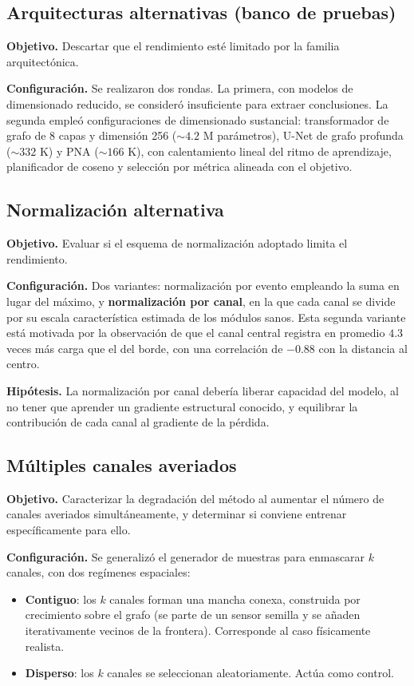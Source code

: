 \subsection{Arquitecturas alternativas (banco de pruebas)}
\label{subsec:exp-sandbox}

\textbf{Objetivo.} Descartar que el rendimiento esté limitado por la familia arquitectónica.

\textbf{Configuración.} Se realizaron dos rondas. La primera, con modelos de dimensionado reducido,
se consideró insuficiente para extraer conclusiones. La segunda empleó configuraciones de
dimensionado sustancial: transformador de grafo de 8 capas y dimensión 256 ($\sim 4.2$ M
parámetros), U-Net de grafo profunda ($\sim 332$ K) y PNA ($\sim 166$ K), con calentamiento lineal
del ritmo de aprendizaje, planificador de coseno y selección por métrica alineada con el objetivo.

\subsection{Normalización alternativa}
\label{subsec:exp-norm}

\textbf{Objetivo.} Evaluar si el esquema de normalización adoptado limita el rendimiento.

\textbf{Configuración.} Dos variantes: normalización por evento empleando la suma en lugar del
máximo, y \textbf{normalización por canal}, en la que cada canal se divide por su escala
característica estimada de los módulos sanos. Esta segunda variante está motivada por la
observación de que el canal central registra en promedio $4.3$ veces más carga que el del borde,
con una correlación de $-0.88$ con la distancia al centro.

\textbf{Hipótesis.} La normalización por canal debería liberar capacidad del modelo, al no tener que
aprender un gradiente estructural conocido, y equilibrar la contribución de cada canal al gradiente
de la pérdida.

\subsection{Múltiples canales averiados}
\label{subsec:exp-multidead}

\textbf{Objetivo.} Caracterizar la degradación del método al aumentar el número de canales
averiados simultáneamente, y determinar si conviene entrenar específicamente para ello.

\textbf{Configuración.} Se generalizó el generador de muestras para enmascarar $k$ canales, con dos
regímenes espaciales:
\begin{itemize}
    \item \textbf{Contiguo}: los $k$ canales forman una mancha conexa, construida por crecimiento
    sobre el grafo (se parte de un sensor semilla y se añaden iterativamente vecinos de la frontera).
    Corresponde al caso físicamente realista.
    \item \textbf{Disperso}: los $k$ canales se seleccionan aleatoriamente. Actúa como control.
\end{itemize}

